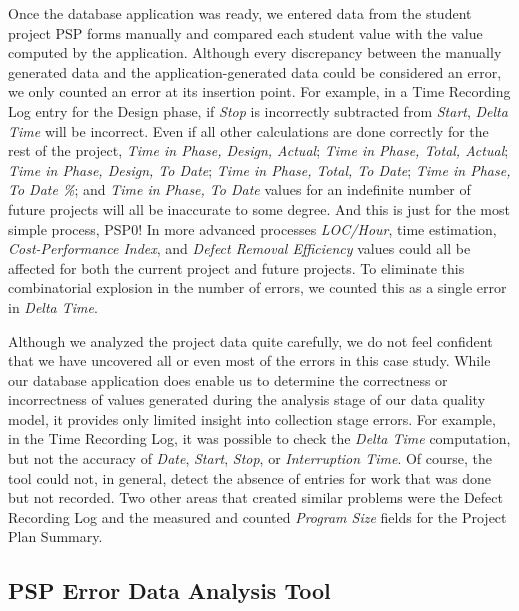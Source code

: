   Once the database application was ready, we entered data from the student
  project PSP forms manually and compared each student value with the
  value computed by the application.  Although every discrepancy
  between the manually generated data and the application-generated data
  could be considered an error, we only counted an error at its insertion
  point.  For example, in a Time Recording Log entry for the Design phase,
  if {\it Stop} is incorrectly subtracted from {\it Start}, {\it Delta
    Time} will be incorrect.  Even if all other calculations are done
  correctly for the rest of the project, {\it Time in Phase, Design,
    Actual}; {\it Time in Phase, Total, Actual}; {\it Time in Phase,
    Design, To Date}; {\it Time in Phase, Total, To Date}; {\it Time in
    Phase, To Date \%}; and {\it Time in Phase, To Date} values for an
  indefinite number of future projects will all be inaccurate to some
  degree.  And this is just for the most simple process, PSP0!  In more
  advanced processes {\it LOC/Hour}, time estimation, {\it Cost-Performance
    Index}, and {\it Defect Removal Efficiency} values could all be
  affected for both the current project and future projects.  To eliminate
  this combinatorial explosion in the number of errors, we counted this as a
  single error in {\it Delta Time}. 
  
  Although we analyzed the project data quite carefully, we do not feel
  confident that we have uncovered all or even most of the errors in this
  case study.  While our database application does enable us to determine
  the correctness or incorrectness of values generated during the analysis
  stage of our data quality model, it provides only limited insight into
  collection stage errors.  For example, in the Time Recording Log, it was
  possible to check the {\it Delta Time} computation, but not the accuracy
  of {\it Date}, {\it Start}, {\it Stop}, or {\it Interruption Time}.  Of
  course, the tool could not, in general, detect the absence of entries for
  work that was done but not recorded.  Two other areas that created
  similar problems were the Defect Recording Log and the measured and
  counted {\it Program Size} fields for the Project Plan Summary.

  \subsection{PSP Error Data Analysis Tool}
  
